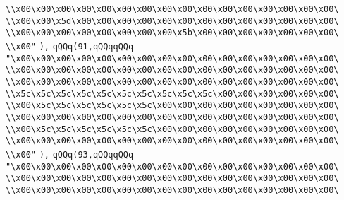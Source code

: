 \verb|\\x00\x00\x00\x00\x00\x00\x00\x00\x00\x00\x00\x00\x00\x00\x00\x00\|\newline
\verb|\\x00\x00\x5d\x00\x00\x00\x00\x00\x00\x00\x00\x00\x00\x00\x00\x00\|\newline
\verb|\\x00\x00\x00\x00\x00\x00\x00\x00\x5b\x00\x00\x00\x00\x00\x00\x00\|\newline
\verb|\\x00"|\newline
\verb|),|\newline
\verb|qQQq(91,qQQqqQQq|\newline
\verb|"\x00\x00\x00\x00\x00\x00\x00\x00\x00\x00\x00\x00\x00\x00\x00\x00\|\newline
\verb|\\x00\x00\x00\x00\x00\x00\x00\x00\x00\x00\x00\x00\x00\x00\x00\x00\|\newline
\verb|\\x00\x00\x00\x00\x00\x00\x00\x00\x00\x00\x00\x00\x00\x00\x00\x00\|\newline
\verb|\\x5c\x5c\x5c\x5c\x5c\x5c\x5c\x5c\x5c\x5c\x00\x00\x00\x00\x00\x00\|\newline
\verb|\\x00\x5c\x5c\x5c\x5c\x5c\x5c\x00\x00\x00\x00\x00\x00\x00\x00\x00\|\newline
\verb|\\x00\x00\x00\x00\x00\x00\x00\x00\x00\x00\x00\x00\x00\x00\x00\x00\|\newline
\verb|\\x00\x5c\x5c\x5c\x5c\x5c\x5c\x00\x00\x00\x00\x00\x00\x00\x00\x00\|\newline
\verb|\\x00\x00\x00\x00\x00\x00\x00\x00\x00\x00\x00\x00\x00\x00\x00\x00\|\newline
\verb|\\x00"|\newline
\verb|),|\newline
\verb|qQQq(93,qQQqqQQq|\newline
\verb|"\x00\x00\x00\x00\x00\x00\x00\x00\x00\x00\x00\x00\x00\x00\x00\x00\|\newline
\verb|\\x00\x00\x00\x00\x00\x00\x00\x00\x00\x00\x00\x00\x00\x00\x00\x00\|\newline
\verb|\\x00\x00\x00\x00\x00\x00\x00\x00\x00\x00\x00\x00\x00\x00\x00\x00\|\newline
